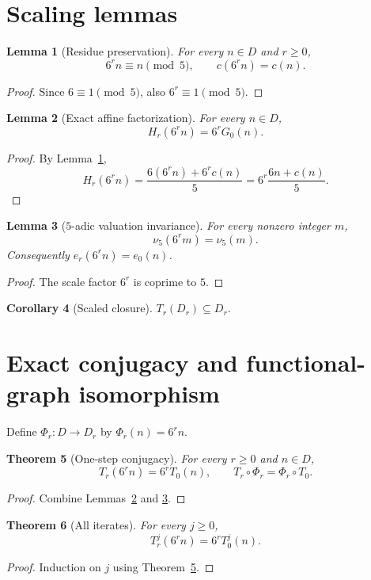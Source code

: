 \documentclass[11pt]{article}
\newtheorem{theorem}{Theorem}[section]
\newtheorem{lemma}[theorem]{Lemma}
\newtheorem{corollary}[theorem]{Corollary}
\theoremstyle{remark}\newtheorem{remark}[theorem]{Remark}\newtheorem{example}[theorem]{Example}
\newcommand{\vfive}{\nu_5}
\begin{document}
\section{Scaling lemmas}
\begin{lemma}[Residue preservation]\label{lem:res}
For every $n\in D$ and $r\ge0$,
\[
6^rn\equiv n\pmod5,\qquad c(6^rn)=c(n).
\]
\end{lemma}
\begin{proof}Since $6\equiv1\pmod5$, also $6^r\equiv1\pmod5$.\end{proof}

\begin{lemma}[Exact affine factorization]\label{lem:factor}
For every $n\in D$,
\[
H_r(6^rn)=6^rG_0(n).
\]
\end{lemma}
\begin{proof}
By Lemma~\ref{lem:res},
\[
H_r(6^rn)=\frac{6(6^rn)+6^rc(n)}5=6^r\frac{6n+c(n)}5.
\]
\end{proof}

\begin{lemma}[$5$-adic valuation invariance]\label{lem:v5}
For every nonzero integer $m$,
\[
\vfive(6^rm)=\vfive(m).
\]
Consequently $e_r(6^rn)=e_0(n)$.
\end{lemma}
\begin{proof}The scale factor $6^r$ is coprime to $5$.\end{proof}

\begin{corollary}[Scaled closure]
$T_r(D_r)\subseteq D_r$.
\end{corollary}

\section{Exact conjugacy and functional-graph isomorphism}
Define $\Phi_r:D\to D_r$ by $\Phi_r(n)=6^rn$.
\begin{theorem}[One-step conjugacy]\label{thm:conj}
For every $r\ge0$ and $n\in D$,
\[
T_r(6^rn)=6^rT_0(n),\qquad T_r\circ\Phi_r=\Phi_r\circ T_0.
\]
\end{theorem}
\begin{proof}Combine Lemmas~\ref{lem:factor} and \ref{lem:v5}.\end{proof}

\begin{theorem}[All iterates]
For every $j\ge0$,
\[
T_r^j(6^rn)=6^rT_0^j(n).
\]
\end{theorem}
\begin{proof}Induction on $j$ using Theorem~\ref{thm:conj}.\end{proof}
\end{document}
